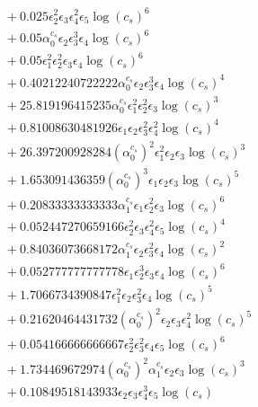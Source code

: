 \documentclass[10pt]{article}
\begin{document}
\begin{align*}
&{}  + 0.025 \epsilon_{2}^{2} \epsilon_{3} \epsilon_{4}^{2} \epsilon_{5} \log{\left(c_{s} \right)}^{6} \\
&{}  + 0.05 \alpha_{0}^{c_s} \epsilon_{2} \epsilon_{3}^{3} \epsilon_{4} \log{\left(c_{s} \right)}^{6} \\
&{}  + 0.05 \epsilon_{1}^{2} \epsilon_{2}^{2} \epsilon_{3} \epsilon_{4} \log{\left(c_{s} \right)}^{6} \\
&{}  + 0.40212240722222 \alpha_{0}^{c_s} \epsilon_{2} \epsilon_{3}^{3} \epsilon_{4} \log{\left(c_{s} \right)}^{4} \\
&{}  + 25.819196415235 \alpha_{0}^{c_s} \epsilon_{1}^{2} \epsilon_{2}^{2} \epsilon_{3} \log{\left(c_{s} \right)}^{3} \\
&{}  + 0.81008630481926 \epsilon_{1} \epsilon_{2} \epsilon_{3}^{2} \epsilon_{4}^{2} \log{\left(c_{s} \right)}^{4} \\
&{}  + 26.397200928284 \left(\alpha_{0}^{c_s}\right)^{2} \epsilon_{1}^{2} \epsilon_{2} \epsilon_{3} \log{\left(c_{s} \right)}^{3} \\
&{}  + 1.653091436359 \left(\alpha_{0}^{c_s}\right)^{3} \epsilon_{1} \epsilon_{2} \epsilon_{3} \log{\left(c_{s} \right)}^{5} \\
&{}  + 0.20833333333333 \alpha_{1}^{c_s} \epsilon_{1} \epsilon_{2}^{2} \epsilon_{3} \log{\left(c_{s} \right)}^{6} \\
&{}  + 0.052447270659166 \epsilon_{2}^{2} \epsilon_{3} \epsilon_{4}^{2} \epsilon_{5} \log{\left(c_{s} \right)}^{4} \\
&{}  + 0.84036073668172 \alpha_{1}^{c_s} \epsilon_{2} \epsilon_{3}^{2} \epsilon_{4} \log{\left(c_{s} \right)}^{2} \\
&{}  + 0.052777777777778 \epsilon_{1} \epsilon_{2}^{3} \epsilon_{3} \epsilon_{4} \log{\left(c_{s} \right)}^{6} \\
&{}  + 1.7066734390847 \epsilon_{1}^{2} \epsilon_{2} \epsilon_{3}^{2} \epsilon_{4} \log{\left(c_{s} \right)}^{5} \\
&{}  + 0.21620464431732 \left(\alpha_{0}^{c_s}\right)^{2} \epsilon_{2} \epsilon_{3} \epsilon_{4}^{2} \log{\left(c_{s} \right)}^{5} \\
&{}  + 0.054166666666667 \epsilon_{2}^{2} \epsilon_{3}^{2} \epsilon_{4} \epsilon_{5} \log{\left(c_{s} \right)}^{6} \\
&{}  + 1.734469672974 \left(\alpha_{0}^{c_s}\right)^{2} \alpha_{1}^{c_s} \epsilon_{2} \epsilon_{3} \log{\left(c_{s} \right)}^{3} \\
&{}  + 0.10849518143933 \epsilon_{2} \epsilon_{3} \epsilon_{4}^{3} \epsilon_{5} \log{\left(c_{s} \right)} \\

\end{align*}
\end{document}
